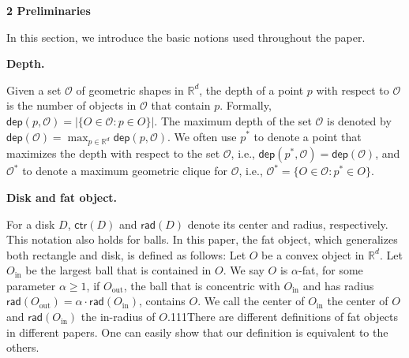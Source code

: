 \par
\par
\par\medskip\noindent\textbf{2 Preliminaries}\par
In this section, we introduce the basic notions used throughout the paper.
\par
\par
\par\medskip\noindent\textbf{Depth.}\par
Given a set $\mathcal{O}$ of geometric shapes in $\mathbb{R}^{d}$, the depth of a point $p$ with respect to $\mathcal{O}$ is the number of objects in $\mathcal{O}$ that contain $p$. Formally, ${\mathsf{dep}}(p,\mathcal{O})=|\{O\in\mathcal{O}:p\in O\}|$. The maximum depth of the set $\mathcal{O}$ is denoted by ${\mathsf{dep}}(\mathcal{O})=\max_{p\in\mathbb{R}^{d}}{\mathsf{dep}}(p,\mathcal%
{O})$. We often use $p^{*}$ to denote a point that maximizes the depth with respect to the set $\mathcal{O}$, i.e., $\mathsf{dep}(p^{*},\mathcal{O})={\mathsf{dep}}(\mathcal{O})$, and $\mathcal{O}^{*}$ to denote a maximum geometric clique for $\mathcal{O}$, i.e., $\mathcal{O}^{*}=\{O\in\mathcal{O}:p^{*}\in O\}$.
\par
\par
\par\medskip\noindent\textbf{Disk and fat object.}\par
For a disk $D$, $\mathsf{ctr}(D)$ and $\mathsf{rad}(D)$ denote its center and radius, respectively. This notation also holds for balls. In this paper, the fat object, which generalizes both rectangle and disk, is defined as follows: Let $O$ be a convex object in $\mathbb{R}^{d}$. Let $O_{\mathrm{in}}$ be the largest ball that is contained in $O$. We say $O$ is $\alpha$-fat, for some parameter $\alpha\geq 1$, if $O_{\mathrm{out}}$, the ball that is concentric with $O_{\mathrm{in}}$ and has radius $\mathsf{rad}(O_{\mathrm{out}})=\alpha\cdot\mathsf{rad}(O_{\mathrm{in}})$, contains $O$. We call the center of $O_{\mathrm{in}}$ the center of $O$ and $\mathsf{rad}(O_{\mathrm{in}})$ the in-radius of $O$.111There are different definitions of fat objects in different papers. One can easily show that our definition is equivalent to the others.
\par
\par

